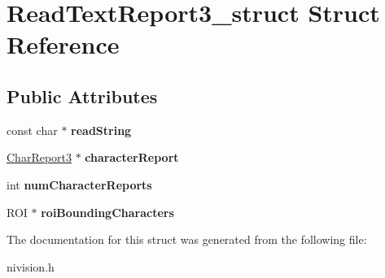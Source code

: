 \hypertarget{structReadTextReport3__struct}{\section{\-Read\-Text\-Report3\-\_\-struct \-Struct \-Reference}
\label{structReadTextReport3__struct}
}
\subsection*{\-Public \-Attributes}
\begin{DoxyCompactItemize}
\item 
\hypertarget{structReadTextReport3__struct_a7ecaf1245de7d09d7db19a84696741c1}{const char $\ast$ {\bfseries read\-String}}\label{structReadTextReport3__struct_a7ecaf1245de7d09d7db19a84696741c1}

\item 
\hypertarget{structReadTextReport3__struct_a3379588f572112f360e1248c305cb1d5}{\hyperlink{structCharReport3__struct}{\-Char\-Report3} $\ast$ {\bfseries character\-Report}}\label{structReadTextReport3__struct_a3379588f572112f360e1248c305cb1d5}

\item 
\hypertarget{structReadTextReport3__struct_a47f025421ba3965ec47e436d6c05788a}{int {\bfseries num\-Character\-Reports}}\label{structReadTextReport3__struct_a47f025421ba3965ec47e436d6c05788a}

\item 
\hypertarget{structReadTextReport3__struct_af18a67c1118183a326394bfa90d73864}{\-R\-O\-I $\ast$ {\bfseries roi\-Bounding\-Characters}}\label{structReadTextReport3__struct_af18a67c1118183a326394bfa90d73864}

\end{DoxyCompactItemize}


\-The documentation for this struct was generated from the following file\-:\begin{DoxyCompactItemize}
\item 
nivision.\-h\end{DoxyCompactItemize}
